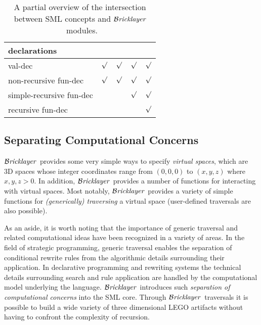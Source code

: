 \documentclass[submission,copyright,creativecommons]{eptcs}
\newcommand{\bricklayer}{\ensuremath{\mathcal{B}\emph{ricklayer}}}
\begin{document}
\begin{table*}[htb!]
\begin{tabular}{@{}lcccc@{}}
\multicolumn{5}{l}{\textbf{declarations}}   \\ \midrule
\qquad val-dec                   & $\surd$    & $\surd$     & $\surd$      & $\surd$     \\ \hline
\qquad non-recursive fun-dec     & $\surd$    & $\surd$     & $\surd$      & $\surd$     \\ \hline
\qquad simple-recursive fun-dec  &            &             & $\surd$      & $\surd$     \\ \hline
\qquad recursive fun-dec         &            &             &              & $\surd$     \\
\bottomrule
\end{tabular}
\caption{A partial overview of the intersection between SML concepts and \bricklayer\ modules.}\label{table-bricklayer}
\end{table*}








\subsection{Separating Computational Concerns}


\bricklayer\ provides some very simple ways to specify \emph{virtual spaces}, which are 3D spaces whose integer coordinates range from $(0,0,0)$ to $(x,y,z)$ where $x,y,z > 0$. In addition, \bricklayer\ provides a number of functions for interacting with virtual spaces. Most notably, \bricklayer\ provides a variety of simple functions for \emph{(generically) traversing} a virtual space (user-defined traversals are also possible).


As an aside, it is worth noting that the importance of generic traversal and related computational ideas have been recognized in a variety of areas. In the field of strategic programming, generic traversal enables the separation of conditional rewrite rules from the algorithmic details surrounding their application. In declarative programming and rewriting systems the technical details surrounding search and rule application are handled by the computational model underlying the language. \bricklayer\ introduces such \emph{separation of computational concerns} into the SML core. Through \bricklayer\ traversals it is possible to build a wide variety of three dimensional LEGO artifacts without having to confront the complexity of recursion.
\end{document}
